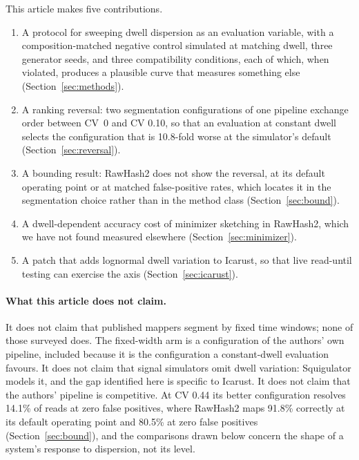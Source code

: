 \documentclass[11pt,a4paper]{article}
\begin{document}
This article makes five contributions.

\begin{enumerate}
  \item A protocol for sweeping dwell dispersion as an evaluation variable, with a
    composition-matched negative control simulated at matching dwell, three generator seeds, and
    three compatibility conditions, each of which, when violated, produces a plausible curve that
    measures something else (Section~\ref{sec:methods}).
  \item A ranking reversal: two segmentation configurations of one pipeline exchange order
    between CV~0 and CV 0.10, so that an evaluation at constant dwell selects the configuration
    that is 10.8-fold worse at the simulator's default (Section~\ref{sec:reversal}).
  \item A bounding result: RawHash2 does not show the reversal, at its default operating point or
    at matched false-positive rates, which locates it in the segmentation choice rather than in
    the method class (Section~\ref{sec:bound}).
  \item A dwell-dependent accuracy cost of minimizer sketching in RawHash2, which we have not
    found measured elsewhere (Section~\ref{sec:minimizer}).
  \item A patch that adds lognormal dwell variation to Icarust, so that live read-until testing
    can exercise the axis (Section~\ref{sec:icarust}).
\end{enumerate}

\paragraph{What this article does not claim.} It does not claim that published mappers segment
by fixed time windows; none of those surveyed does. The fixed-width arm is a configuration of the
authors' own pipeline, included because it is the configuration a constant-dwell evaluation
favours. It does not claim that signal simulators omit dwell variation: Squigulator models it, and
the gap identified here is specific to Icarust. It does not claim that the authors' pipeline is
competitive. At CV 0.44 its better configuration resolves 14.1\% of reads at zero false positives,
where RawHash2 maps 91.8\% correctly at its default operating point and 80.5\% at zero false
positives (Section~\ref{sec:bound}), and the comparisons drawn below concern the shape of a system's
response to dispersion, not its level.
\end{document}
